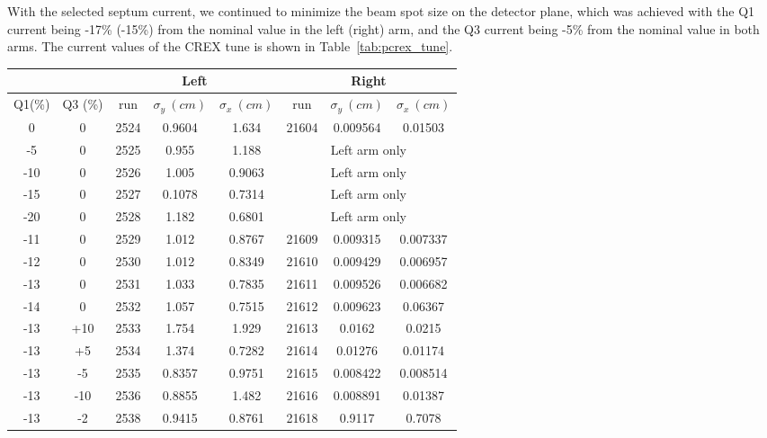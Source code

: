 With the selected septum current, we continued to minimize the beam spot size 
on the detector plane, which was achieved with the Q1 current being -17\% (-15\%) 
from the nominal value in the left (right) arm, and the Q3 current being -5\% from
the nominal value in both arms. The current values of the CREX tune is shown 
in Table~\ref{tab:pcrex_tune}.
\begin{table}[h!]
    \begin{tabular}{c c | c c c | c c c}
	\hline
	& & \multicolumn{3}{c}{Left} & \multicolumn{3}{c}{Right}  \\
	\hline
	Q1(\%)  & Q3 (\%)    & run   & $\sigma_y\ (cm)$  & $\sigma_x\ (cm)$   & run   & $\sigma_y\ (cm)$    & $\sigma_x\ (cm)$    \\
	\hline
	0   & 0	    & 2524  & 0.9604	& 1.634	    & 21604	& 0.009564  & 0.01503 \\
	-5  & 0	    & 2525  & 0.955	& 1.188	    & \multicolumn{3}{c}{Left arm only}    \\
	-10 & 0	    & 2526  & 1.005	& 0.9063    & \multicolumn{3}{c}{Left arm only}    \\ 
	-15 & 0	    & 2527  & 0.1078	& 0.7314    & \multicolumn{3}{c}{Left arm only}    \\ 
	-20 & 0	    & 2528  & 1.182	& 0.6801    & \multicolumn{3}{c}{Left arm only}    \\ 
	\hline                              
	-11 & 0	    & 2529  & 1.012	& 0.8767    & 21609	& 0.009315  & 0.007337	\\
	-12 & 0	    & 2530  & 1.012	& 0.8349    & 21610	& 0.009429  & 0.006957  \\
	-13 & 0	    & 2531  & 1.033	& 0.7835    & 21611	& 0.009526  & 0.006682  \\
	-14 & 0	    & 2532  & 1.057	& 0.7515    & 21612	& 0.009623  & 0.06367   \\
	\hline                              
	-13 & +10   & 2533  & 1.754	& 1.929	    & 21613	& 0.0162    & 0.0215    \\
	-13 & +5    & 2534  & 1.374	& 0.7282    & 21614	& 0.01276   & 0.01174   \\
	-13 & -5    & 2535  & 0.8357	& 0.9751    & 21615	& 0.008422  & 0.008514  \\
	-13 & -10   & 2536  & 0.8855	& 1.482	    & 21616	& 0.008891  & 0.01387   \\
	\hline
	-13 & -2    & 2538  & 0.9415	& 0.8761    & 21618	& 0.9117    & 0.7078  \\

\end{tabular}
\end{table}
